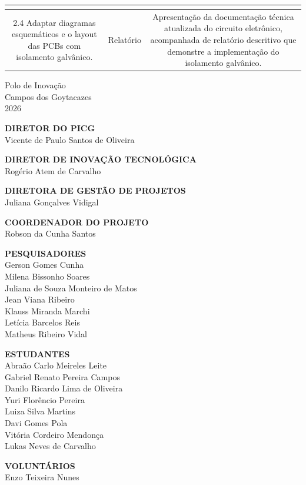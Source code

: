 \begin{center}
\begin{center}
\begin{tabular}{|c|c|c|}
{        }\\
    \hline
        \multicolumn{1}{|m{5cm}|}{
            2.4 Adaptar diagramas esquemáticos e o layout
das PCBs com isolamento galvânico.
        } 
        & \multicolumn{1}{m{3.5cm}|}{
            \centering
            Relatório
        } 
        & \multicolumn{1}{m{6.5cm}|}{
            Apresentação da
documentação técnica
atualizada do circuito
eletrônico, acompanhada de
relatório descritivo que
demonstre a implementação
do isolamento galvânico.

        }\\
    \hline
    \end{tabular}
\end{center}

    \vfill
    \centering
    Polo de Inovação\\
    Campos dos Goytacazes\\
    2026

    \newpage

    \vfill
    \textbf{DIRETOR DO PICG}\\
    Vicente de Paulo Santos de Oliveira
    \vfill
    
    \textbf{DIRETOR DE INOVAÇÃO TECNOLÓGICA}\\
    Rogério Atem de Carvalho
    \vfill
    
    \textbf{DIRETORA DE GESTÃO DE PROJETOS}\\
    Juliana Gonçalves Vidigal
    \vfill
    
    \textbf{COORDENADOR DO PROJETO}\\
    Robson da Cunha Santos
    \vfill
    
    \textbf{PESQUISADORES}\\
    Gerson Gomes Cunha\\
    Milena Bissonho Soares\\
    Juliana de Souza Monteiro de Matos\\
    Jean Viana Ribeiro \\
    Klauss Miranda Marchi \\
    Letícia Barcelos Reis \\
    Matheus Ribeiro Vidal
    \vfill
    
    \textbf{ESTUDANTES}\\
    Abraão Carlo Meireles Leite\\
    Gabriel Renato Pereira Campos\\
    Danilo Ricardo Lima de Oliveira\\
    Yuri Florêncio Pereira\\
    Luiza Silva Martins\\
    Davi Gomes Pola\\
    Vitória Cordeiro Mendonça\\
    Lukas Neves de Carvalho
    \vfill

    \textbf{VOLUNTÁRIOS}\\
    Enzo Teixeira Nunes
    \vfill
\end{center}